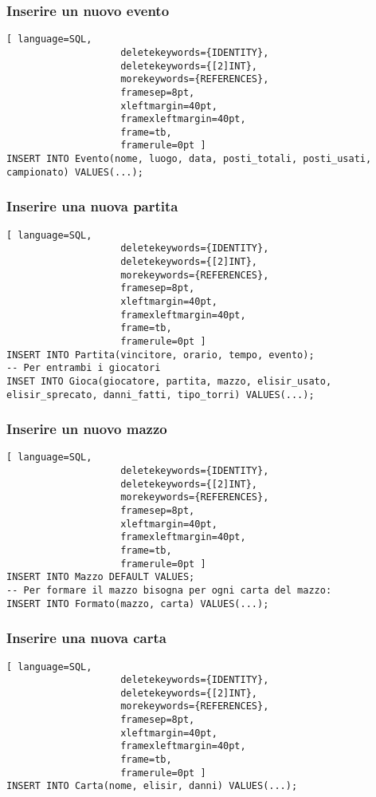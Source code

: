 \documentclass{article}
\begin{document}
\subsubsection{Inserire un nuovo evento}
\begin{lstlisting}[ language=SQL,
                    deletekeywords={IDENTITY},
                    deletekeywords={[2]INT},
                    morekeywords={REFERENCES},
                    framesep=8pt,
                    xleftmargin=40pt,
                    framexleftmargin=40pt,
                    frame=tb,
                    framerule=0pt ]
INSERT INTO Evento(nome, luogo, data, posti_totali, posti_usati, campionato) VALUES(...);
\end{lstlisting}

\subsubsection{Inserire una nuova partita}
\begin{lstlisting}[ language=SQL,
                    deletekeywords={IDENTITY},
                    deletekeywords={[2]INT},
                    morekeywords={REFERENCES},
                    framesep=8pt,
                    xleftmargin=40pt,
                    framexleftmargin=40pt,
                    frame=tb,
                    framerule=0pt ]
INSERT INTO Partita(vincitore, orario, tempo, evento);
-- Per entrambi i giocatori
INSET INTO Gioca(giocatore, partita, mazzo, elisir_usato, elisir_sprecato, danni_fatti, tipo_torri) VALUES(...);
\end{lstlisting}

\subsubsection{Inserire un nuovo mazzo}
\begin{lstlisting}[ language=SQL,
                    deletekeywords={IDENTITY},
                    deletekeywords={[2]INT},
                    morekeywords={REFERENCES},
                    framesep=8pt,
                    xleftmargin=40pt,
                    framexleftmargin=40pt,
                    frame=tb,
                    framerule=0pt ]
INSERT INTO Mazzo DEFAULT VALUES;
-- Per formare il mazzo bisogna per ogni carta del mazzo:
INSERT INTO Formato(mazzo, carta) VALUES(...);
\end{lstlisting}

\subsubsection{Inserire una nuova carta}
\begin{lstlisting}[ language=SQL,
                    deletekeywords={IDENTITY},
                    deletekeywords={[2]INT},
                    morekeywords={REFERENCES},
                    framesep=8pt,
                    xleftmargin=40pt,
                    framexleftmargin=40pt,
                    frame=tb,
                    framerule=0pt ]
INSERT INTO Carta(nome, elisir, danni) VALUES(...);
\end{lstlisting}
\end{document}

